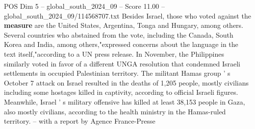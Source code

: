 \begin{textsample}{POS Dim 5 – global\_south\_2024\_09 – Score 11.00 – global\_south\_2024\_09/114568707.txt}
Besides Israel, those who voted against the \textbf{measure} are the United States, Argentina, Tonga and Hungary, among others.
Several countries who abstained from the vote, including the Canada, South Korea and India, among others,"expressed concerns about the language in the text itself,"according to a UN press release.
In November, the Philippines similarly voted in favor of a different UNGA resolution that condemned Israeli settlements in occupied Palestinian territory.
The militant Hamas group ' s October 7 attack on Israel resulted in the deaths of 1,205 people, mostly civilians including some hostages killed in captivity, according to official Israeli figures.
Meanwhile, Israel ' s military offensive has killed at least 38,153 people in Gaza, also mostly civilians, according to the health ministry in the Hamas-ruled territory. -- with a report by Agence France-Presse

\end{textsample}
